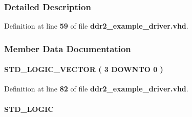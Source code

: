 \subsubsection{Detailed Description}


Definition at line {\bf 59} of file {\bf ddr2\+\_\+example\+\_\+driver.\+vhd}.



\subsubsection{Member Data Documentation}
\paragraph[{addr\+\_\+value}]{ {\bfseries \textcolor{comment}{S\+T\+D\+\_\+\+L\+O\+G\+I\+C\+\_\+\+V\+E\+C\+T\+OR}\textcolor{vhdlchar}{ }\textcolor{vhdlchar}{(}\textcolor{vhdlchar}{ }\textcolor{vhdlchar}{ } \textcolor{vhdldigit}{3} \textcolor{vhdlchar}{ }\textcolor{keywordflow}{D\+O\+W\+N\+TO}\textcolor{vhdlchar}{ }\textcolor{vhdlchar}{ } \textcolor{vhdldigit}{0} \textcolor{vhdlchar}{ }\textcolor{vhdlchar}{)}\textcolor{vhdlchar}{ }} \hspace{0.3cm}{\ttfamily [Signal]}}\label{classddr2__example__driver_1_1europa_aa94c6a04189a0e503e9f2e94a9025971}


Definition at line {\bf 82} of file {\bf ddr2\+\_\+example\+\_\+driver.\+vhd}.

\paragraph[{avalon\+\_\+burst\+\_\+mode}]{ {\bfseries \textcolor{comment}{S\+T\+D\+\_\+\+L\+O\+G\+IC}\textcolor{vhdlchar}{ }} \hspace{0.3cm}{\ttfamily [Signal]}}\label{classddr2__example__driver_1_1europa_ae666880260032372ddde1ed95db5fe66}


